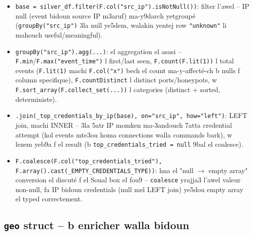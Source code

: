 \documentclass[11pt,a4paper]{report}
\DeclareRobustCommand{\code}[1]{\texttt{#1}}
\begin{document}
\begin{itemize}
  \item \code{base = silver\_df.filter(F.col("src\_ip").isNotNull())}:
        filter l'awel -- IP null (event bidoun source IP m3aruf) ma-y9darch
        yetgroupé (\code{groupBy("src\_ip")} 3la null ye5dem, walakin
        yentej row \code{"unknown"} li mahouch useful/meaningful).
  \item \code{groupBy("src\_ip").agg(...)}: el aggregation el asasi --
        \code{F.min}/\code{F.max("event\_time")} l first/last seen,
        \code{F.count(F.lit(1))} l total events (\code{F.lit(1)} machi
        \code{F.col("x")} bech el count ma-y-affecté-ch b nulls f column
        specifique), \code{F.countDistinct} l distinct ports/honeypots,
        w \code{F.sort\_array(F.collect\_set(...))} l categories (distinct
        + sorted, deterministe).
  \item \code{.join(\_top\_credentials\_by\_ip(base), on="src\_ip",
        how="left")}: LEFT join, machi INNER -- 3la 5atr IP momken ma-3andouch
        7atta credential attempt (kol events mte3ou homa connections walla
        commands bark), w lezem yeb9a f el result (b \code{top\_credentials\_tried
        = null} 9bal el coalesce).
  \item \code{F.coalesce(F.col("top\_credentials\_tried"), F.array().cast(\_EMPTY\_CREDENTIALS\_TYPE))}:
        hna el "null $\to$ empty array" conversion el discuté f el Soual
        box el fou9 -- \code{coalesce} yrajja3 l'awel valeur non-null,
        fa IP bidoun credentials (null mel LEFT join) ye5dou empty array
        el typed correctement.
\end{itemize}

\subsection{\code{geo} struct -- b enricher walla bidoun}
\end{document}
